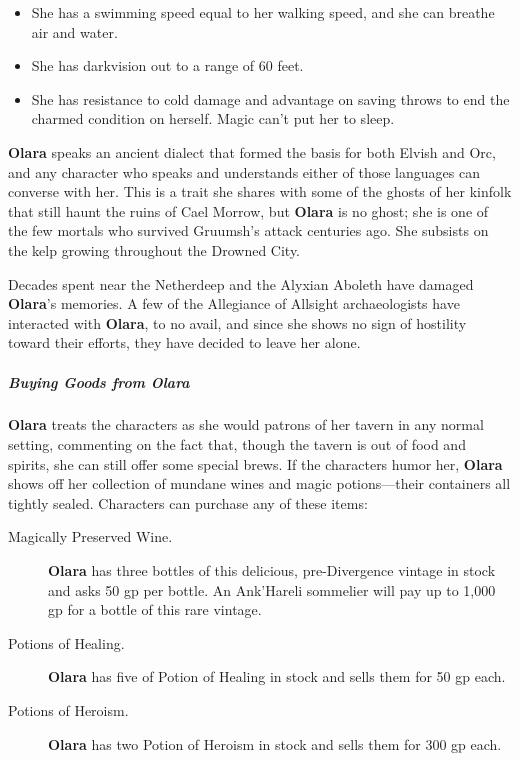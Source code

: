 \documentclass[10pt,a4paper,twoside,bg=print,twocolumn,openany,nodeprecatedcode]{dndbook}
\begin{document}
\begin{itemize}
\item She has a swimming speed equal to her walking speed, and she can breathe air and water.
\item She has darkvision out to a range of 60 feet.
\item She has resistance to cold damage and advantage on saving throws to end the charmed condition on herself. Magic can't put her to sleep.
\end{itemize}

\textbf{Olara} speaks an ancient dialect that formed the basis for both Elvish and Orc, and any character who speaks and understands either of those languages can converse with her. This is a trait she shares with some of the ghosts of her kinfolk that still haunt the ruins of Cael Morrow, but \textbf{Olara} is no ghost; she is one of the few mortals who survived Gruumsh's attack centuries ago. She subsists on the kelp growing throughout the Drowned City.

Decades spent near the Netherdeep and the Alyxian Aboleth have damaged \textbf{Olara}'s memories. A few of the Allegiance of Allsight archaeologists have interacted with \textbf{Olara}, to no avail, and since she shows no sign of hostility toward their efforts, they have decided to leave her alone.

\subparagraph{Buying Goods from Olara}
\textbf{Olara} treats the characters as she would patrons of her tavern in any normal setting, commenting on the fact that, though the tavern is out of food and spirits, she can still offer some special brews. If the characters humor her, \textbf{Olara} shows off her collection of mundane wines and magic potions—their containers all tightly sealed. Characters can purchase any of these items:


\begin{description}
\item[Magically Preserved Wine.]
\textbf{Olara} has three bottles of this delicious, pre-Divergence vintage in stock and asks 50 gp per bottle. An Ank'Hareli sommelier will pay up to 1,000 gp for a bottle of this rare vintage.
\item[Potions of Healing.]
\textbf{Olara} has five of Potion of Healing in stock and sells them for 50 gp each.
\item[Potions of Heroism.]
\textbf{Olara} has two Potion of Heroism in stock and sells them for 300 gp each.
\end{description}
\end{document}
